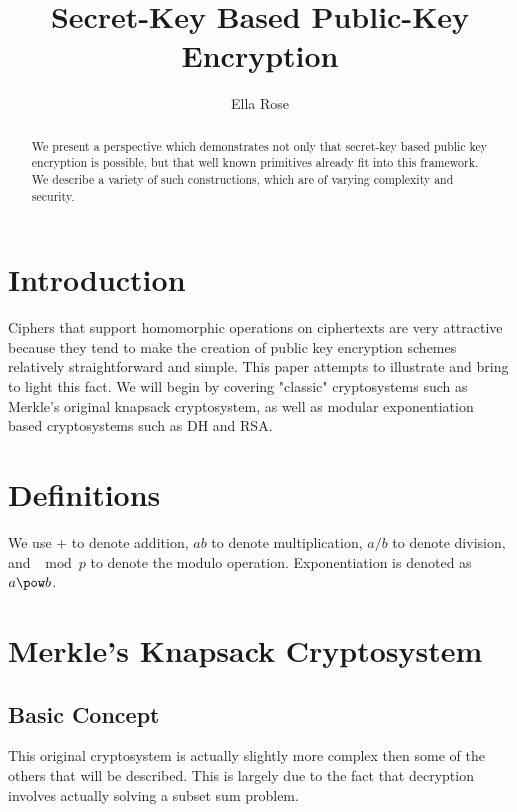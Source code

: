 \documentclass[preprint]{iacrtrans}
\author{Ella Rose\inst{1}}
\institute{Paso Robles, CA\email{python_pride@protonmail.com}}
\title[Secret-Key Based Public-Key Encryption]{Secret-Key Based Public-Key Encryption}
\begin{document}
\maketitle


\begin{abstract}
 We present a perspective which demonstrates not only that secret-key based public key encryption is possible, but that well known primitives already fit into this framework. We describe a variety of such constructions, which are of varying complexity and security.
\end{abstract}

\todototoc
\listoftodos

\section{Introduction}
 Ciphers that support homomorphic operations on ciphertexts are very attractive because they tend to make the creation of public key encryption schemes relatively straightforward and simple. This paper attempts to illustrate and bring to light this fact. We will begin by covering "classic" cryptosystems such as Merkle's original knapsack cryptosystem, as well as modular exponentiation based cryptosystems such as DH and RSA.

\section{Definitions}
We use $+$ to denote addition, $ab$ to denote multiplication, $a / b$ to denote division, and $\mod p$ to denote the modulo operation. Exponentiation is denoted as $a \pow b$.

\section{Merkle's Knapsack Cryptosystem}
\subsection{Basic Concept}
This original cryptosystem is actually slightly more complex then some of the others that will be described. This is largely due to the fact that decryption involves actually solving a subset sum problem.
\end{document}
